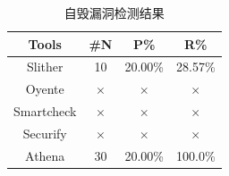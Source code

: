 \begin{table}[htbp]
\begin{minipage}[t]{0.48\textwidth}
  \label{tab:eval_llc}%
  \end{minipage}
  \begin{minipage}[t]{0.48\textwidth}
    \caption{自毁漏洞检测结果}
    \begin{tabular}{cccc}
    \toprule
    Tools & \#N & P\% & R\% \\
    \midrule
    Slither & 10    & 20.00\%    & 28.57\% \\
    Oyente  & $\times$ & $\times$ & $\times$ \\
    Smartcheck  & $\times$ & $\times$ & $\times$ \\
    Securify & $\times$  & $\times$ & $\times$ \\
    Athena & 30    & 20.00\%     & 100.0\% \\
    \bottomrule
    \end{tabular}%
  \label{tab:eval_selfdestruct}%
  \end{minipage}
\end{table}%


